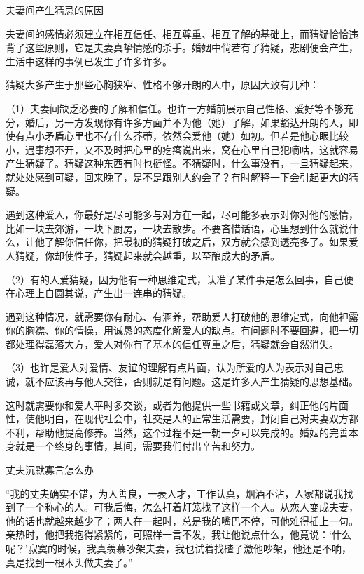 \documentclass[12pt,UTF8]{ctexbook}
\begin{document}
夫妻间产生猜忌的原因


夫妻间的感情必须建立在相互信任、相互尊重、相互了解的基础上，而猜疑恰恰违背了这些原则，它是夫妻真挚情感的杀手。婚姻中倘若有了猜疑，悲剧便会产生，生活中这样的事例已发生了许多许多。

猜疑大多产生于那些心胸狭窄、性格不够开朗的人中，原因大致有几种：

（1）夫妻间缺乏必要的了解和信任。也许一方婚前展示自己性格、爱好等不够充分，婚后，另一方发现你有许多方面并不为他（她）了解，如果豁达开朗的人，即使有点小矛盾心里也不存什么芥蒂，依然会爱他（她）如初。但若是他心眼比较小，遇事想不开，又不及时把心里的疙瘩说出来，窝在心里自己犯嘀咕，这就容易产生猜疑了。猜疑这种东西有时也挺怪。不猜疑时，什么事没有，一旦猜疑起来，就处处感到可疑，回来晚了，是不是跟别人约会了？有时解释一下会引起更大的猜疑。

遇到这种爱人，你最好是尽可能多与对方在一起，尽可能多表示对你对他的感情，比如一块去郊游，一块下厨房，一块去散步。不要吝惜话语，心里想到什么就说什么，让他了解你信任你，把最初的猜疑打破之后，双方就会感到透亮多了。如果爱人猜疑，你却使性子，猜疑起来就会越重，以至酿成大的矛盾。

（2）有的人爱猜疑，因为他有一种思维定式，认准了某件事是怎么回事，自己便在心理上自圆其说，产生出一连串的猜疑。

遇到这种情况，就需要你有耐心、有涵养，帮助爱人打破他的思维定式，向他袒露你的胸襟、你的情操，用诚恳的态度化解爱人的缺点。有问题时不要回避，把一切都处理得磊落大方，爱人对你有了基本的信任尊重之后，猜疑就会自然消失。

（3）也许是爱人对爱情、友谊的理解有点片面，认为所爱的人为表示对自己忠诚，就不应该再与他人交往，否则就是有问题。这是许多人产生猜疑的思想基础。

这时就需要你和爱人平时多交谈，或者为他提供一些书籍或文章，纠正他的片面性，使他明白，在现代社会中，社交是人的正常生活需要，封闭自己对夫妻双方都不利，帮助他提高修养。当然，这个过程不是一朝一夕可以完成的。婚姻的完善本身就是一个终身的事情，其间，需要我们付出辛苦和努力。





丈夫沉默寡言怎么办


“我的丈夫确实不错，为人善良，一表人才，工作认真，烟酒不沾，人家都说我找到了一个称心的人。可我后悔，怎么打着灯笼找了这样一个人。从恋人变成夫妻，他的话也就越来越少了；两人在一起时，总是我的嘴巴不停，可他难得插上一句。亲热时，他把我抱得紧紧的，可照样一言不发，我让他说点什么，他竟说：‘什么呢？’寂寞的时候，我真羡慕吵架夫妻，我也试着找碴子激他吵架，他还是不响，真是找到一根木头做夫妻了。”
\end{document}

